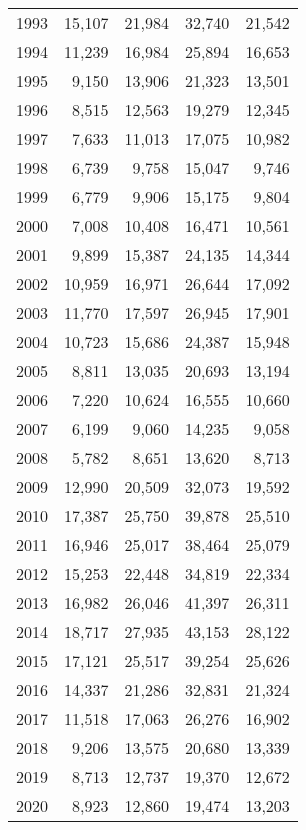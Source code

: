 \documentclass[11pt]{book}
\begin{document}
\begin{longtable}[]{@{}lrrrr@{}}
1993 & 15,107 & 21,984 & 32,740 & 21,542\tabularnewline
1994 & 11,239 & 16,984 & 25,894 & 16,653\tabularnewline
1995 & 9,150 & 13,906 & 21,323 & 13,501\tabularnewline
1996 & 8,515 & 12,563 & 19,279 & 12,345\tabularnewline
1997 & 7,633 & 11,013 & 17,075 & 10,982\tabularnewline
1998 & 6,739 & 9,758 & 15,047 & 9,746\tabularnewline
1999 & 6,779 & 9,906 & 15,175 & 9,804\tabularnewline
2000 & 7,008 & 10,408 & 16,471 & 10,561\tabularnewline
2001 & 9,899 & 15,387 & 24,135 & 14,344\tabularnewline
2002 & 10,959 & 16,971 & 26,644 & 17,092\tabularnewline
2003 & 11,770 & 17,597 & 26,945 & 17,901\tabularnewline
2004 & 10,723 & 15,686 & 24,387 & 15,948\tabularnewline
2005 & 8,811 & 13,035 & 20,693 & 13,194\tabularnewline
2006 & 7,220 & 10,624 & 16,555 & 10,660\tabularnewline
2007 & 6,199 & 9,060 & 14,235 & 9,058\tabularnewline
2008 & 5,782 & 8,651 & 13,620 & 8,713\tabularnewline
2009 & 12,990 & 20,509 & 32,073 & 19,592\tabularnewline
2010 & 17,387 & 25,750 & 39,878 & 25,510\tabularnewline
2011 & 16,946 & 25,017 & 38,464 & 25,079\tabularnewline
2012 & 15,253 & 22,448 & 34,819 & 22,334\tabularnewline
2013 & 16,982 & 26,046 & 41,397 & 26,311\tabularnewline
2014 & 18,717 & 27,935 & 43,153 & 28,122\tabularnewline
2015 & 17,121 & 25,517 & 39,254 & 25,626\tabularnewline
2016 & 14,337 & 21,286 & 32,831 & 21,324\tabularnewline
2017 & 11,518 & 17,063 & 26,276 & 16,902\tabularnewline
2018 & 9,206 & 13,575 & 20,680 & 13,339\tabularnewline
2019 & 8,713 & 12,737 & 19,370 & 12,672\tabularnewline
2020 & 8,923 & 12,860 & 19,474 & 13,203\tabularnewline
\bottomrule
\end{longtable}
\clearpage
\end{document}

